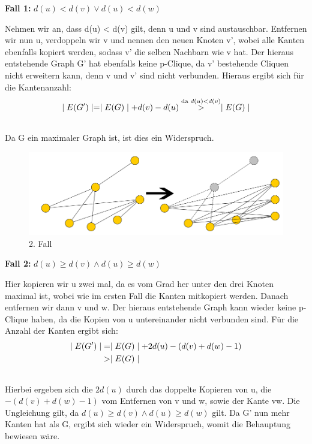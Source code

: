 \documentclass[12pt, a4paper]{article}
\begin{document}
\textbf{Fall 1:} $d(u) < d(v) \vee d(u) < d(w)$

Nehmen wir an, dass d(u) \textless{} d(v) gilt, denn u und v sind austauschbar.
Entfernen wir nun u, verdoppeln wir v und nennen den neuen Knoten v', wobei alle Kanten ebenfalls kopiert werden, sodass v' die selben Nachbarn wie v hat. Der hieraus entstehende Graph G' hat ebenfalls keine p-Clique, da v' bestehende Cliquen nicht erweitern kann, denn v und v' sind nicht verbunden. Hieraus ergibt sich für die Kantenanzahl:
\begin{gather}
\begin{split}\mid E(G') \mid = \mid E(G) \mid + d(v) - d(u) \overset{\text{da } d(u) < d(v)}{>} \mid E(G) \mid\end{split}\notag\\\begin{split}\end{split}\notag
\end{gather}
Da G ein maximaler Graph ist, ist dies ein Widerspruch.


\begin{figure}[H] 
		\centering
		\includegraphics[page=1, width=\textwidth]{assets/proof5-case2}
		\caption{2. Fall} 
\end{figure}

\textbf{Fall 2:} $d(u) \ge d(v) \wedge d(u) \ge d(w)$

Hier kopieren wir u zwei mal, da es vom Grad her unter den drei Knoten maximal ist, wobei wie im ersten Fall die Kanten mitkopiert werden. Danach entfernen wir dann v und w. Der hieraus entstehende Graph kann wieder keine p-Clique haben, da die Kopien von u untereinander nicht verbunden sind. Für die Anzahl der Kanten ergibt sich:
\begin{gather}
\begin{split}\mid E(G') \mid &= \mid E(G) \mid + 2 d(u) - (d(v) + d(w) - 1) \\
&> \mid E(G) \mid\end{split}\notag\\\begin{split}\end{split}\notag
\end{gather}
Hierbei ergeben sich die $2d(u)$ durch das doppelte Kopieren von u, die $- (d(v) + d(w) - 1)$ vom Entfernen von v und w, sowie der Kante vw. Die Ungleichung gilt, da $d(u) \ge d(v) \wedge d(u) \ge d(w)$ gilt. Da G' nun mehr Kanten hat als G, ergibt sich wieder ein Widerspruch, womit die Behauptung bewiesen wäre.
\end{document}
